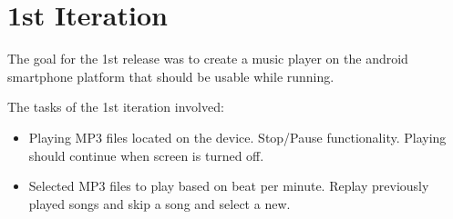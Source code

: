 \section{1st Iteration}
The goal for the 1st release was to create a music player on the android smartphone platform that should be usable while running. 


The tasks of the 1st iteration involved:
\begin{itemize}
\item Playing MP3 files located on the device.
\subitem Stop/Pause functionality.
\subitem Playing should continue when screen is turned off.
\item Selected MP3 files to play based on beat per minute. 
\subitem Replay previously played songs and skip a song and select a new.
\end{itemize}

